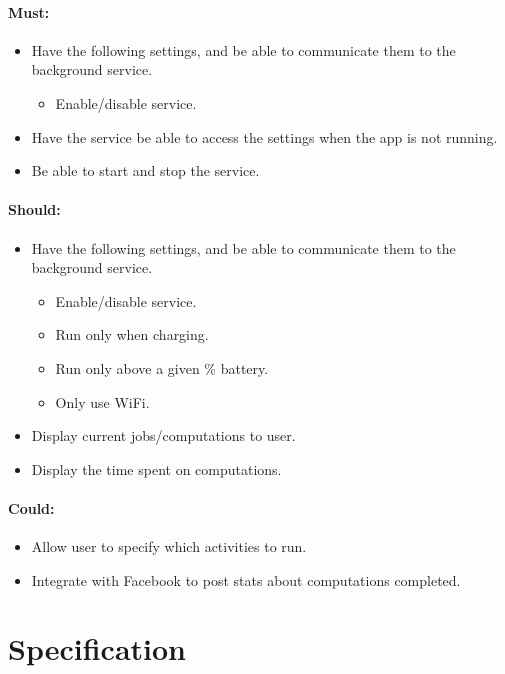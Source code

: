 \documentclass[a4paper,10pt]{article}
\begin{document}
\paragraph{Must:}

\begin{itemize}
\item Have the following settings, and be able to communicate them to the background service.
\begin{itemize}
\item Enable/disable service.
\end{itemize}
\item Have the service be able to access the settings when the app is not running.
\item Be able to start and stop the service.
\end{itemize}

\paragraph{Should:}

\begin{itemize}
\item Have the following settings, and be able to communicate them to the background service.
\begin{itemize}
\item Enable/disable service.
\item Run only when charging.
\item Run only above a given \% battery.
\item Only use WiFi.
\end{itemize}
\item Display current jobs/computations to user.
\item Display the time spent on computations.
\end{itemize}

\paragraph{Could:}

\begin{itemize}
\item Allow user to specify which activities to run.
\item Integrate with Facebook to post stats about computations completed.
\end{itemize}



\section{Specification}
\end{document}
